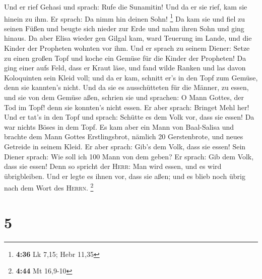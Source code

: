  Und er rief Gehasi und sprach: Rufe die Sunamitin! Und
da er sie rief, kam sie hinein zu ihm. Er sprach: Da nimm hin deinen
Sohn! \footnote{\textbf{4:36} Lk 7,15; Hebr 11,35}  Da
kam sie und fiel zu seinen Füßen und beugte sich nieder zur Erde und
nahm ihren Sohn und ging hinaus.  Da aber Elisa wieder
gen Gilgal kam, ward Teuerung im Lande, und die Kinder der Propheten
wohnten vor ihm. Und er sprach zu seinem Diener: Setze zu einen großen
Topf und koche ein Gemüse für die Kinder der Propheten! 
Da ging einer aufs Feld, dass er Kraut läse, und fand wilde Ranken und
las davon Koloquinten sein Kleid voll; und da er kam, schnitt er's in
den Topf zum Gemüse, denn sie kannten's nicht.  Und da
sie es ausschütteten für die Männer, zu essen, und sie von dem Gemüse
aßen, schrien sie und sprachen: O Mann Gottes, der Tod im Topf! denn sie
konnten's nicht essen.  Er aber sprach: Bringet Mehl her!
Und er tat's in den Topf und sprach: Schütte es dem Volk vor, dass sie
essen! Da war nichts Böses in dem Topf.  Es kam aber ein
Mann von Baal-Salisa und brachte dem Mann Gottes Erstlingsbrot, nämlich
20 Gerstenbrote, und neues Getreide in seinem Kleid. Er aber sprach:
Gib's dem Volk, dass sie essen!  Sein Diener sprach: Wie
soll ich 100 Mann von dem geben? Er sprach: Gib dem Volk, dass sie
essen! Denn so spricht der \textsc{Herr}: Man wird essen, und es wird
übrigbleiben.  Und er legte es ihnen vor, dass sie aßen;
und es blieb noch übrig nach dem Wort des \textsc{Herrn}. \footnote{\textbf{4:44}
  Mt 16,9-10}

\hypertarget{section-2}{%
\section{5}\label{section-2}}

